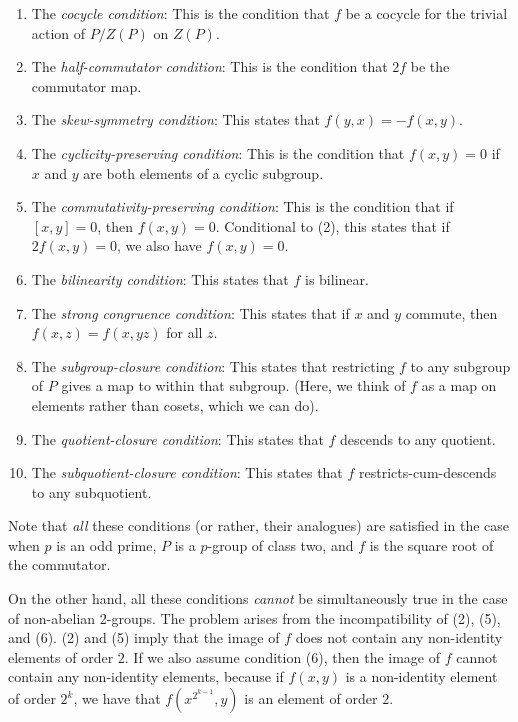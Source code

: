 \documentclass[10pt]{amsart}
\begin{document}
\begin{enumerate}
\item The {\em cocycle condition}: This is the condition that $f$ be a
  cocycle for the trivial action of $P/Z(P)$ on $Z(P)$.
\item The {\em half-commutator condition}: This is the condition that
  $2f$ be the commutator map.
\item The {\em skew-symmetry condition}: This states that $f(y,x) =
  -f(x,y)$.
\item The {\em cyclicity-preserving condition}: This is the condition
  that $f(x,y) = 0$ if $x$ and $y$ are both elements of a cyclic subgroup.
\item The {\em commutativity-preserving condition}: This is the
  condition that if $[x,y] = 0$, then $f(x,y) = 0$. Conditional to
  (2), this states that if $2f(x,y) = 0$, we also have $f(x,y) = 0$.
\item The {\em bilinearity condition}: This states that $f$ is
  bilinear.
\item The {\em strong congruence condition}: This states that if $x$
  and $y$ commute, then $f(x,z) = f(x,yz)$ for all $z$.
\item The {\em subgroup-closure condition}: This states that
  restricting $f$ to any subgroup of $P$ gives a map to within that
  subgroup. (Here, we think of $f$ as a map on elements rather than
  cosets, which we can do).
\item The {\em quotient-closure condition}: This states that $f$
  descends to any quotient.
\item The {\em subquotient-closure condition}: This states that $f$
  restricts-cum-descends to any subquotient.
\end{enumerate}

Note that {\em all} these conditions (or rather, their analogues) are
satisfied in the case when $p$ is an odd prime, $P$ is a $p$-group of
class two, and $f$ is the square root of the commutator.

On the other hand, all these conditions {\em cannot} be simultaneously
true in the case of non-abelian 2-groups. The problem arises from the
incompatibility of (2), (5), and (6). (2) and (5) imply that the image
of $f$ does not contain any non-identity elements of order $2$. If we
also assume condition (6), then the image of $f$ cannot contain any
non-identity elements, because if $f(x,y)$ is a non-identity element
of order $2^k$, we have that $f(x^{2^{k-1}},y)$ is an element of order
$2$.
\end{document}
